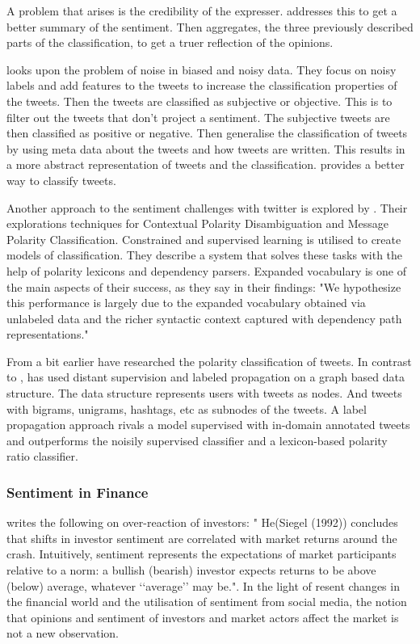 A problem that arises is the credibility of the expresser. \cite[]{Li2013206} addresses this to
get a better summary of the sentiment. Then aggregates, the
three previously described parts of the classification, to get a truer
reflection of the opinions.

\cite[]{barbosa10} looks upon the problem of noise in biased and noisy data. 
They focus on noisy labels and add features to the tweets to increase the
classification properties of the tweets. Then the tweets are classified as
subjective or objective. This is to filter out the tweets that don't project a
sentiment. The subjective tweets are then classified as positive or negative.
Then \cite[]{barbosa10} generalise the classification of tweets by using meta
data about the tweets and how tweets are written. This results in a more
abstract representation of tweets and the classification. \cite[]{barbosa10}
provides a better way to classify tweets.

Another approach to the sentiment challenges with twitter is explored by
\cite[]{becker13}. Their explorations techniques for Contextual Polarity Disambiguation
and Message Polarity Classification. Constrained and supervised learning is
utilised to create models of classification. They describe a system that solves
these tasks with the help of polarity lexicons and dependency parsers. 
Expanded vocabulary is one of the main aspects of their success, as they say in
their findings: "We hypothesize this performance is largely due to the expanded vocabulary
obtained via unlabeled data and the richer syntactic context captured with
dependency path representations." \cite[]{becker13}

From a bit earlier \cite[]{sperious11} have researched the polarity classification of tweets. 
In contrast to \cite[]{becker13}, \cite[]{sperious11} has used distant
supervision and labeled propagation on a graph based data structure. The data
structure represents users with tweets as nodes. And tweets with bigrams,
unigrams, hashtags, etc as subnodes of the tweets. A label propagation approach
rivals a model supervised with in-domain annotated tweets and outperforms the
noisily supervised classifier and a lexicon-based polarity ratio classifier.
\cite[]{sperious11} 

\subsubsection{Sentiment in Finance}
\cite[p2]{Brown20041} writes the following on over-reaction of investors: "
He(Siegel (1992)) concludes that shifts in investor sentiment are correlated
with market returns around the crash. Intuitively, sentiment represents the
expectations of market participants relative to a norm: a bullish (bearish)
investor expects returns to be above (below) average, whatever ‘‘average’’ may
be.". In the light of resent changes in the financial world and the utilisation
of sentiment from social media, the notion that opinions and sentiment of
investors and market actors affect the market is not a new observation.

